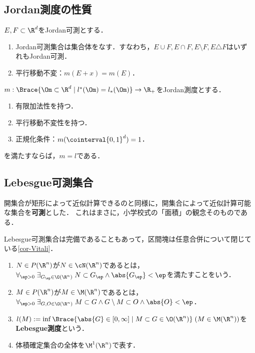 \documentclass[uplatex, dvipdfmx]{jsreport}
\begin{document}
\subsection{Jordan測度の性質}

\begin{proposition}
    $E,F\subset\R^d$をJordan可測とする．
    \begin{enumerate}
        \item Jordan可測集合は集合体をなす．すなわち，$E\cup F,E\cap F,E\setminus F,E\triangle F$はいずれもJordan可測．
        \item 平行移動不変：$m(E+x)=m(E)$．
    \end{enumerate}
\end{proposition}

\begin{proposition}
    $m:\Brace{\Om\subset\R^d\mid l^*(\Om)=l_*(\Om)}\to\R_+$をJordan測度とする．
    \begin{enumerate}
        \item 有限加法性を持つ．
        \item 平行移動不変性を持つ．
        \item 正規化条件：$m(\cointerval{0,1}^d)=1$．
    \end{enumerate}
    を満たすならば，$m=l$である．
\end{proposition}

\subsection{Lebesgue可測集合}

\begin{tcolorbox}[colframe=ForestGreen, colback=ForestGreen!10!white,breakable,colbacktitle=ForestGreen!40!white,coltitle=black,fonttitle=\bfseries\sffamily,
title=]
    開集合が矩形によって近似計算できるのと同様に，開集合によって近似計算可能な集合を\textbf{可測}とした．
    これはまさに，小学校式の「面積」の観念そのものである．

    Lebesgue可測集合は完備であることもあって，区間塊は任意合併について閉じている\ref{cor-Vitali}．
\end{tcolorbox}

\begin{definition}\mbox{}
    \begin{enumerate}
        \item $N\in P(\R^n)$が$N\in\cN(\R^n)$であるとは，$\forall_{\ep>0}\;\exists_{G_\ep\in\O(\R^n)}\;N\subset G_\ep\land\abs{G_\ep}<\ep$を満たすことをいう．
        \item $M\in P(\R^n)$が$M\in\M(\R^n)$であるとは，$\forall_{\ep>0}\;\exists_{G,O\in\O(\R^n)}\;M\subset G\land G\setminus M\subset O\land \abs{O}<\ep$．
        \item $l(M):=\inf\Brace{\abs{G}\in[0,\infty]\mid M\subset G\in\O(\R^n)}\;(M\in\M(\R^n))$を\textbf{Lebesgue測度}という．
        \item 体積確定集合の全体を$\M^1(\R^n)$で表す．
    \end{enumerate}
\end{definition}
\end{document}
